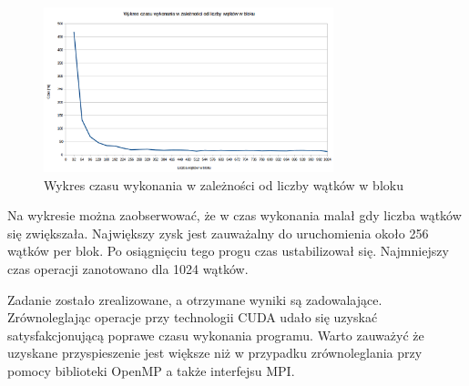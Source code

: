 \documentclass[a4paper,12pt]{article}
\begin{document}
\begin{figure}[H]
	\centering
  \includegraphics[width=0.75\textwidth]{dane/wykres1.png}
  \caption{Wykres czasu wykonania w zależności od liczby wątków w bloku}
\end{figure}

Na wykresie można zaobserwować, że w czas wykonania malał gdy liczba wątków się zwiększała. Największy zysk jest zauważalny do uruchomienia około 256 wątków per blok. Po osiągnięciu tego progu czas ustabilizował się. Najmniejszy czas operacji zanotowano dla 1024 wątków.

Zadanie zostało zrealizowane, a otrzymane wyniki są zadowalające.
Zrównoleglając operacje przy technologii CUDA udało się uzyskać satysfakcjonującą poprawe czasu wykonania programu. Warto zauważyć że uzyskane przyspieszenie jest większe niż w przypadku zrównoleglania przy pomocy biblioteki OpenMP a także interfejsu MPI.
\end{document}
